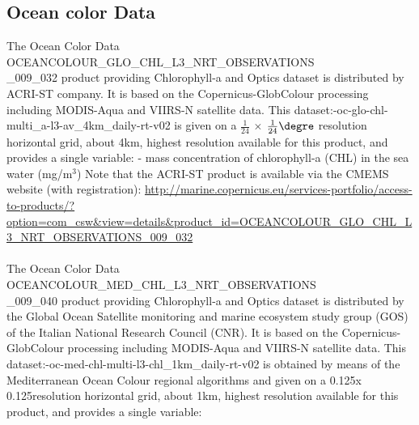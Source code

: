 \documentclass[12pt,a4paper]{article}
\begin{document}
\subsection{Ocean color Data}
The Ocean Color Data OCEANCOLOUR\_GLO\_CHL\_L3\_NRT\_OBSERVATIONS \\ \_009\_032 product providing Chlorophyll-a and Optics dataset is distributed by ACRI-ST company. It is based on the Copernicus-GlobColour processing including MODIS-Aqua and VIIRS-N satellite data. \newline 
This dataset:-oc-glo-chl-multi\_a-l3-av\_4km\_daily-rt-v02 is given on a $\frac{1}{24}$ $\times$ $\frac{1}{24}\degre$ resolution horizontal grid, about 4km, highest resolution available for this product, and provides a single variable: \newline
- mass concentration of chlorophyll-a (CHL) in the sea water (mg/m$^{3}$) \newline
Note that the ACRI-ST product is available via the CMEMS website  (with 
registration): \url{http://marine.copernicus.eu/services-portfolio/access-to-products/?option=com_csw&view=details&product_id=OCEANCOLOUR_GLO_CHL_L3_NRT_OBSERVATIONS_009_032}
\\
\\
The Ocean Color Data OCEANCOLOUR\_MED\_CHL\_L3\_NRT\_OBSERVATIONS \\ \_009\_040 product providing Chlorophyll-a and Optics dataset is distributed by the Global Ocean Satellite monitoring and marine ecosystem study group (GOS) of the Italian National Research Council (CNR). It is based on the Copernicus-GlobColour processing including MODIS-Aqua and VIIRS-N satellite data. \newline 
This dataset:-oc-med-chl-multi-l3-chl\_1km\_daily-rt-v02 is obtained by means of the Mediterranean Ocean Colour regional algorithms and given on a 0.125\degre x 0.125\degre  resolution horizontal grid, about 1km, highest resolution available for this product, and provides a single variable: \newline
\end{document}
